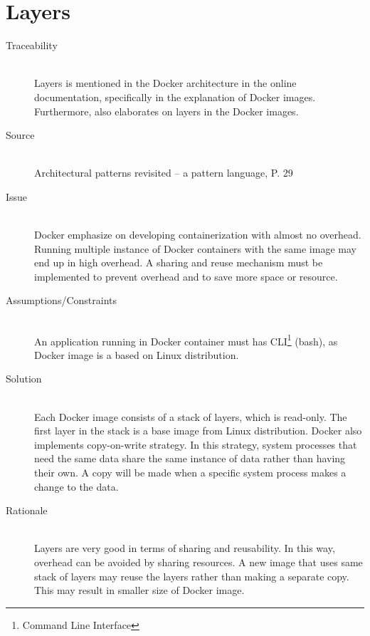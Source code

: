 \section{Layers}


\begin{description}
\item [Traceability]~\\
Layers is mentioned in the Docker architecture in the online documentation,
specifically in the explanation of Docker images\cite{dockerarchi}. Furthermore,
\cite{dockerimage} also elaborates on layers in the Docker images.

\item [Source]~\\
Architectural patterns revisited -- a pattern language, P. 29
\cite{avgeriou2005architectural}

\item [Issue]~\\
Docker emphasize on developing containerization with almost no overhead. Running
multiple instance of Docker containers with the same image may end up in high
overhead. A sharing and reuse mechanism must be implemented to prevent overhead
and to save more space or resource.

\item [Assumptions/Constraints]~\\
An application running in Docker container must has CLI\footnote{Command Line
Interface} (bash), as Docker image is a based on Linux distribution.

\item [Solution]~\\
Each Docker image consists of a stack of layers, which is read-only. The first
layer in the stack is a base image from Linux distribution. Docker also
implements copy-on-write strategy. In this strategy, system processes that need
the same data share the same instance of data rather than having their own. A
copy will be made when a specific system process makes a change to the data.

\item [Rationale] ~\\
Layers are very good in terms of sharing and reusability. In this way, overhead
can be avoided by sharing resources. A new image that uses same stack of layers
may reuse the layers rather than making a separate copy. This may result in
smaller size of Docker image.


\end{description}
